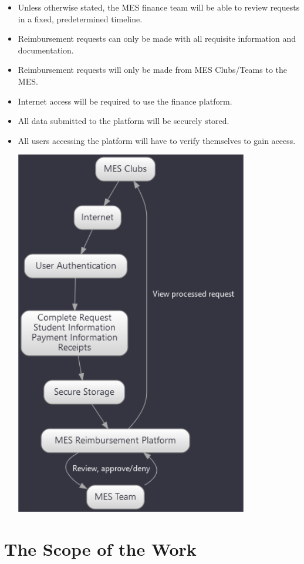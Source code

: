 \documentclass[12pt]{article}
\begin{document}
\begin{itemize}
    \item Unless otherwise stated, the MES finance team will be able to review requests in a fixed, predetermined timeline.
    \item Reimbursement requests can only be made with all requisite information and documentation.
    \item Reimbursement requests will only be made from MES Clubs/Teams to the MES.
    \item Internet access will be required to use the finance platform.
    \item All data submitted to the platform will be securely stored.
    \item All users accessing the platform will have to verify themselves to gain aceess.

    \includegraphics[width=0.8\textwidth]{imgs/assumptions.png}
\end{itemize}


\section{The Scope of the Work}
\end{document}
